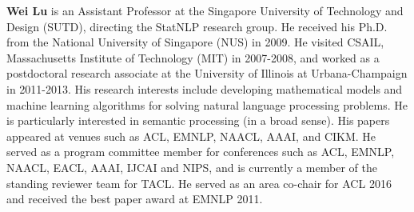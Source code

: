 \begin{bio}
  {\bfseries Wei Lu} is an Assistant Professor at the Singapore University of Technology and Design (SUTD), directing the StatNLP research group. He received his Ph.D. from the National University of Singapore (NUS) in 2009. He visited CSAIL, Massachusetts Institute of Technology (MIT) in 2007-2008, and worked as a postdoctoral research associate at the University of Illinois at Urbana-Champaign in 2011-2013. His research interests include developing mathematical models and machine learning algorithms for solving natural language processing problems. He is particularly interested in semantic processing (in a broad sense). His papers appeared at venues such as ACL, EMNLP, NAACL, AAAI, and CIKM. He served as a program committee member for conferences such as ACL, EMNLP, NAACL, EACL, AAAI, IJCAI and NIPS, and is currently a member of the standing reviewer team for TACL. He served as an area co-chair for ACL 2016 and received the best paper award at EMNLP 2011.
\end{bio}

